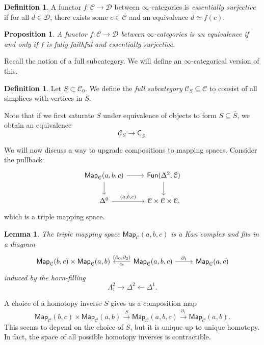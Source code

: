 \documentclass[10pt]{amsart}
\newtheorem{prop}[thm]{Proposition}
\newtheorem{lem}[thm]{Lemma}
\theoremstyle{definition}
\newtheorem{defn}[thm]{Definition}
\theoremstyle{remark}
\theoremstyle{plain}
\theoremstyle{definition}
\theoremstyle{remark}
\newcommand{\mc}[1]{\mathcal{#1}}
\newcommand{\ms}[1]{\mathsf{#1}}
\newcommand{\1}{\mathbf{1}}
\newcommand{\2}{\mathbf{2}}
\newcommand{\3}{\mathbf{3}}
\begin{document}
\begin{defn}
    A functor $f \colon \mc{C} \to \mc{D}$ between $\infty$-categories is \textit{essentially surjective} if for all $d \in \mc{D}$, there exists some $c \in \mc{C}$ and an equivalence $d \simeq f(c)$.
\end{defn}

\begin{prop}
    A functor $f \colon \mc{C} \to \mc{D}$ between $\infty$-categories is an equivalence if and only if $f$ is fully faithful and essentially surjective.
\end{prop}

Recall the notion of a full subcategory. We will define an $\infty$-categorical version of this.

\begin{defn}
    Let $S \subset \mc{C}_0$. We define the \textit{full subcategory} $\mc{C}_S \subseteq \mc{C}$ to consist of all simplices with vertices in $S$.
\end{defn}

Note that if we first saturate $S$ under equivalence of objects to form $S \subseteq \bar{S}$, we obtain an equivalence
\[ \mc{C}_S \to \ms{C}_{\bar{S}}. \]

We will now discuss a way to upgrade compositions to mapping spaces. Consider the pullback
\begin{equation*}
\begin{tikzcd}
    \ms{Map}_{\mc{C}}(a,b,c) \ar{r} \ar{d} & \ms{Fun}(\Delta^2, \mc{C}) \ar{d} \\
    \Delta^0 \ar{r}{(a,b,c)} & \mc{C} \times \mc{C} \times \mc{C},
\end{tikzcd}
\end{equation*}
which is a triple mapping space.

\begin{lem}
    The triple mapping space $\ms{Map}_{\mc{C}}(a,b,c)$ is a Kan complex and fits in a diagram
    \begin{equation*}
    \begin{tikzcd}
        \ms{Map}_{\mc{C}}(b,c) \times \ms{Map}_{\mc{C}}(a,b) & \ms{Map}_{\mc{C}}(a,b,c) \ar{l}[swap]{(\partial_0, \partial_2)}{\simeq} \ar{r}{\partial_1} & \ms{Map}_{\mc{C}}(a,c)
    \end{tikzcd}
    \end{equation*}
    induced by the horn-filling
    \[ \Lambda_1^2 \to \Delta^2 \gets \Delta^1. \]
\end{lem}

A choice of a homotopy inverse $S$ gives us a composition map
\[ \ms{Map}_{\mc{C}}(b,c) \times \ms{Map}_{\mc{C}}(a,b) \xrightarrow{S} \ms{Map}_{\mc{C}}(a,b,c) \xrightarrow{\partial_1} \ms{Map}_{\mc{C}}(a,b). \]
This seems to depend on the choice of $S$, but it is unique up to unique homotopy. In fact, the space of all possible homotopy inverses is contractible.
\end{document}

